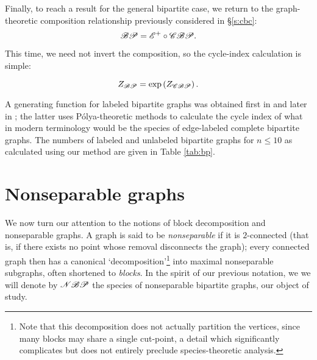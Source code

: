 \documentclass[sectionflow,singlespace,twoside]{brandiss} %
\numberwithin{section}{chapter}
\numberwithin{figure}{chapter}
\begin{document}
Finally, to reach a result for the general bipartite case, we return to the graph-theoretic composition relationship previously considered in \S \ref{s:cbc}:
\begin{equation*}
  \mathscr{BP} = \mathscr{E}^{+} \circ \mathscr{CBP}.
\end{equation*}

This time, we need not invert the composition, so the cycle-index calculation is simple:
\begin{theorem}
  \begin{equation}
    Z_{\mathscr{BP}} = \exp \left( {Z_{\mathscr{CBP}}} \right).
  \end{equation}
\end{theorem}

A generating function for labeled bipartite graphs was obtained first in \cite{harprins:bipartite} and later in \cite{han:bipartite}; the latter uses P\'{o}lya-theoretic methods to calculate the cycle index of what in modern terminology would be the species of edge-labeled complete bipartite graphs.
The numbers of labeled and unlabeled bipartite graphs for $n \leq 10$ as calculated using our method are given in Table \ref{tab:bp}.

\section{Nonseparable graphs}\label{s:nbp}
We now turn our attention to the notions of block decomposition and nonseparable graphs.
A graph is said to be \emph{nonseparable} if it is $2$-connected (that is, if there exists no point whose removal disconnects the graph); every connected graph then has a canonical `decomposition'\footnote{Note that this decomposition does not actually partition the vertices, since many blocks may share a single cut-point, a detail which significantly complicates but does not entirely preclude species-theoretic analysis.} into maximal nonseparable subgraphs, often shortened to \emph{blocks}.
In the spirit of our previous notation, we we will denote by $\mathscr{NBP}$ the species of nonseparable bipartite graphs, our object of study.
\end{document}

